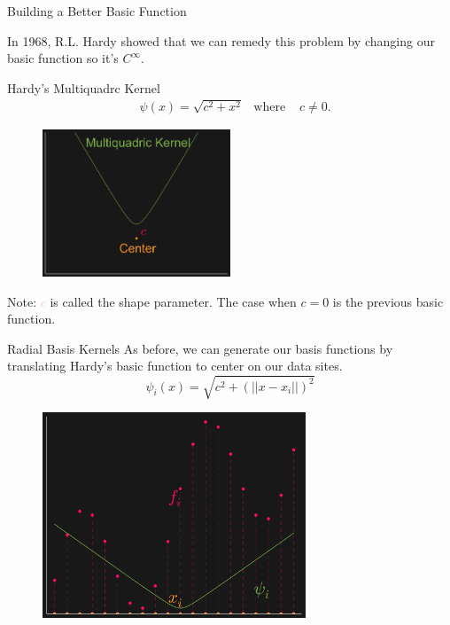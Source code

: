 \documentclass[12pt,t]{beamer}
\newcommand{\subt}[1]{{\footnotesize \color{subtitle} {#1}}}
\begin{document}
\begin{frame}{Building a Better Basic Function}

In 1968, R.L. Hardy showed that we can remedy this problem by changing our basic function so it's $C^\infty$.

\subt{Hardy's Multiquadrc Kernel}
\begin{align*}
&\psi(x)=\sqrt{c^2 + x^2} &\text{where   } &c \neq 0.
\end{align*}


\begin{figure}
\includegraphics[width=0.5\textwidth, keepaspectratio]{fig7.png}
\end{figure}

\subt{Note:} \textcolor{pink}{$c$} is called the shape parameter. The case when $c=0$ is 
 the previous basic function.

\note{}
\end{frame}

\begin{frame}{Radial Basis Kernels}
As before, we can generate our basis functions by translating Hardy's basic function to center on our data sites.
\begin{equation*}
\psi_i(x)=\sqrt{c^2 + (||x-x_i||)^2}
\end{equation*}
\begin{figure}
\includegraphics[width=0.7\textwidth, keepaspectratio]{fig8.png}
\end{figure}

\note{}
\end{frame}
\end{document}
